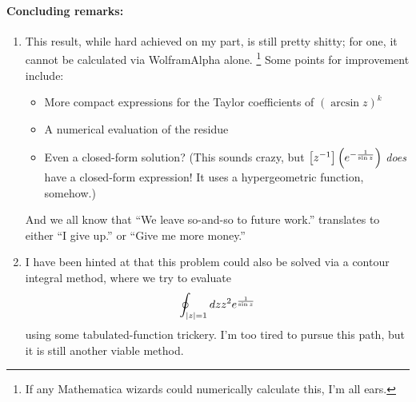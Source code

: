 \paragraph{Concluding remarks:}
\begin{enumerate}[wide, labelindent = 0pt, label = (\roman*)]
\item
This result, while hard achieved on my part, is still pretty shitty;
for one, it cannot be calculated via WolframAlpha alone.%
\footnote{If any Mathematica wizards could numerically calculate this, I'm all ears.}
Some points for improvement include:
\begin{itemize}
    \item More compact expressions for the Taylor coefficients of ${(\arcsin z)}^k$
    \item A numerical evaluation of the residue
    \item Even a closed-form solution?
    (This sounds crazy, but $\left[ z^{-1} \right] \left( e^{-\frac{1}{\sin z}} \right)$ \emph{does} have a closed-form expression!
    It uses a hypergeometric function, somehow.)
\end{itemize}
And we all know that ``We leave so-and-so to future work.'' translates to
either ``I give up.'' or ``Give me more money.''

\item
I have been hinted at that this problem could also be solved via a contour integral method,
where we try to evaluate
\[
    \oint_{\left| z \right| = 1} dz z^2 e^{\frac{1}{\sin z}}
\]
using some tabulated-function trickery.
I'm too tired to pursue this path, but it is still another viable method.

\end{enumerate}